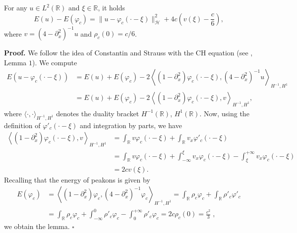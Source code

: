 \documentclass[10pt,a4paper,twoside]{article}
\begin{document}
\begin{Lem}\label{Lemma P2}
For any $u\in L^{2}(\mathbb{R})$ and $\xi\in\mathbb{R}$, it holds
\begin{equation}
E(u)-E(\varphi_{c})=\|u-\varphi_{c}(\cdot-\xi)\|^{2}_{\mathcal{H}}+4c\left(v(\xi)-\frac{c}{6}\right),
\label{P8}
\end{equation}
where $v=(4-\partial^{2}_{x})^{-1}u$ and $\rho_{c}(0)=c/6$.
\end{Lem}
\noindent
\textbf{Proof.} We follow the idea of Constantin and Strauss with the CH equation (see \cite{MR1737505}, Lemma $1$). We compute 
\begin{align}\label{P9}
E(u-\varphi_{c}(\cdot-\xi))&=E(u)+E(\varphi_{c})-2\left\langle(1-\partial^{2}_{x})\varphi_{c}(\cdot-\xi),
(4-\partial^{2}_{x})^{-1}u\right\rangle_{H^{-1},H^{1}}\nonumber\\
&=E(u)+E(\varphi_{c})-2\left\langle(1-\partial^{2}_{x})\varphi_{c}(\cdot-\xi),
v\right\rangle_{H^{-1},H^{1}},
\end{align}
where $\langle\cdot,\cdot\rangle_{H^{-1},H^{1}}$ denotes the duality bracket $H^{-1}(\mathbb{R})$, $H^{1}(\mathbb{R})$.
Now, using the definition of $\varphi'_{c}(\cdot-\xi)$ and integration by parts, we have  
\begin{align}\label{P10}
\left\langle(1-\partial^{2}_{x})\varphi_{c}(\cdot-\xi),v\right\rangle_{H^{-1},H^{1}}&=
\int_{\mathbb{R}}v\varphi_{c}(\cdot-\xi)+
\int_{\mathbb{R}}v_{x}\varphi'_{c}(\cdot-\xi)\nonumber\\
&=\int_{\mathbb{R}}v\varphi_{c}(\cdot-\xi)+
\int_{-\infty}^{\xi}v_{x}\varphi_{c}(\cdot-\xi)
-\int_{\xi}^{+\infty}v_{x}\varphi_{c}(\cdot-\xi)\nonumber\\
&=2cv(\xi).
\end{align}
Recalling  that the energy of peakons is given by 
\begin{align}\label{P11}
E(\varphi_{c})&=
\left\langle(1-\partial^{2}_{x})\varphi_{c},(4-\partial^{2}_{x})^{-1}\varphi_{c}
\right\rangle_{H^{-1},H^{1}}
=\int_{\mathbb{R}}\rho_{c}\varphi_{c}+\int_{\mathbb{R}}\rho'_{c}\varphi'_{c}\nonumber\\
&=\int_{\mathbb{R}}\rho_{c}\varphi_{c}
+\int_{-\infty}^{0}\rho'_{c}\varphi_{c}
-\int_{0}^{+\infty}\rho'_{c}\varphi_{c}
=2c\rho_{c}(0)
=\frac{c^{2}}{3} \; , 
\end{align}
we  obtain the lemma. \hfill $\square$ \vspace*{2mm}
\end{document}
